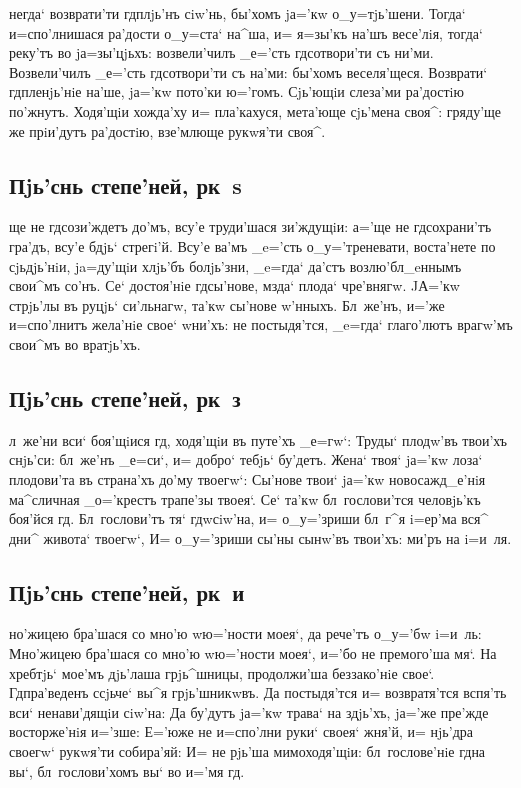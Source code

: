 \documentclass[12pt,twoside,a6paper,xdvi,civil=antiqua]{hipbook}
\begin{document}
негда` возврати'ти гд плjь'нъ сiw'нь, бы'хомъ jа='кw
о_у=тjь'шени. Тогда` и=спо'лнишася ра'дости о_у=ста` на^ша, и= я=зы'къ на'шъ
весе'лiя, тогда` реку'тъ во jа=зы'цjьхъ: возвели'чилъ _е='сть гд сотвори'ти
съ ни'ми. Возвели'чилъ _е='сть гд сотвори'ти съ на'ми: бы'хомъ
веселя'щеся. Возврати` гд пленjь'нiе на'ше, jа='кw пото'ки
ю='гомъ. Сjь'ющiи слеза'ми ра'достiю по'жнутъ. Ходя'щiи хожда'ху и=
пла'кахуся, мета'юще сjь'мена своя^: гряду'ще же прi\-и'\-дутъ ра'достiю,
взе'млюще рукwя'ти своя^.

\delimpict

\subsection{Пjь'снь степе'ней, рк~s}

ще не гд сози'ждетъ до'мъ, всу'е тру\-ди'\-ша\-ся зи'ждущiи:
а='ще не гд со\-хра\-ни'тъ гра'дъ, всу'е бдjь` стрегi'й. Всу'е ва'мъ
_e='сть о_у='треневати, воста'нете по сjь\-дjь'\-нiи, ja=ду'щiи хлjь'бъ
болjь'зни, _e=гда` да'стъ воз\-лю'б\-л_eн\-нымъ свои^мъ со'нъ. Се` достоя'нiе
гд сы'нове, мзда` плода` чре'внягw. JА='кw стрjь'лы въ руцjь` си'льнагw,
та'кw сы'нове w'нныхъ.  Бл~же'нъ, и='же и=спо'лнитъ же\-ла'\-нiе свое`
w\т ни'хъ: не постыдя'тся, _e=гда` глаго'лютъ врагw'мъ свои^мъ во вратjь'хъ.

\delimpict

\subsection{Пjь'снь степе'ней, рк~з}

л~же'ни вси` боя'щiися гд, ходя'щiи въ путе'хъ _е=гw`: Труды`
\kavykabegin{}плодw'въ твои'хъ снjь'си: бл~же'нъ _е=си`, и=
добро` тебjь` бу'детъ. Жена` твоя` jа='кw лоза` плодови'та въ стра\-на'хъ до'му
твоегw`: Сы'нове твои` jа='кw новосажд_е'нiя ма^сличная _о='крестъ трапе'зы
тво\-ея`. Се` та'кw бл~гослови'тся человjь'къ боя'йся гд. Бл~гослови'тъ тя`
гд w\т сiw'на, и= о_у='зриши бл~г^я i=ер'ма вся^ дни^ живота` твоегw`,
И= о_у='зриши сы'ны сынw'въ твои'хъ: ми'ръ на i=и~ля.

\delimpict

\subsection{Пjь'снь степе'ней, рк~и}

но'жицею бра'шася со мно'ю w\т ю='ности моея`, да рече'тъ о_у='бw
i=и~ль: Мно'жицею бра'шася со мно'ю w\т ю='ности моея`, и='бо не премого'ша
мя`. На хребтjь` мое'мъ дjь'лаша грjь^шницы, продолжи'ша беззако'нiе
свое`. Гд пра'веденъ ссjьче` вы^я грjь'шникwвъ. Да постыдя'тся и=
возвратя'тся вспя'ть вси` ненави'дящiи сiw'на: Да бу'дутъ jа='кw трава`
\kavykabegin{}на здjь'хъ, jа='же пре'жде восторже'нiя
и='зше: Е='юже не и=спо'лни руки` своея` жня'й, и= нjь'дра своегw` рукwя'ти
собира'яй: И= не рjь'ша мимоходя'щiи: бл~гослове'нiе гд на вы`,
бл~гослови'хомъ вы` во и='мя гд.
\end{document}
